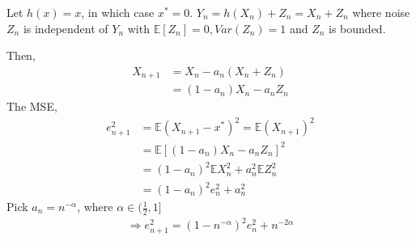 \documentclass[11pt]{elegantbook}
\begin{document}
\begin{example}
    Let $h(x) = x$, in which case $x^* = 0$. $Y_n=h(X_n)+Z_n=X_n+Z_n$ where noise $Z_n$ is independent of $Y_n$ with $\mathbb{E}[Z_n]=0,Var(Z_n)=1$ and $Z_n$ is bounded.
\end{example}
Then,
    \begin{equation}
        \begin{aligned}
            X_{n+1}&=X_n-a_n(X_n+Z_n)\\
            &=(1-a_n)X_n-a_n Z_n
        \end{aligned}
        \nonumber
    \end{equation}
The MSE,
\begin{equation}
    \begin{aligned}
        e_{n+1}^2&=\mathbb{E}(X_{n+1}-x^*)^2=\mathbb{E}(X_{n+1})^2\\
        &=\mathbb{E}[(1-a_n)X_n-a_n Z_n]^2\\
        &=(1-a_n)^2\mathbb{E}X_n^2+a_n^2\mathbb{E}Z_n^2\\
        &=(1-a_n)^2e_n^2+a_n^2
    \end{aligned}
    \nonumber
\end{equation}
Pick $a_n=n^{-\alpha}$, where $\alpha\in (\frac{1}{2},1]$
\begin{equation}
    \begin{aligned}
        \Rightarrow e_{n+1}^2=(1-n^{-\alpha})^2e_n^2+n^{-2\alpha}
    \end{aligned}
    \nonumber
\end{equation}
\end{document}
